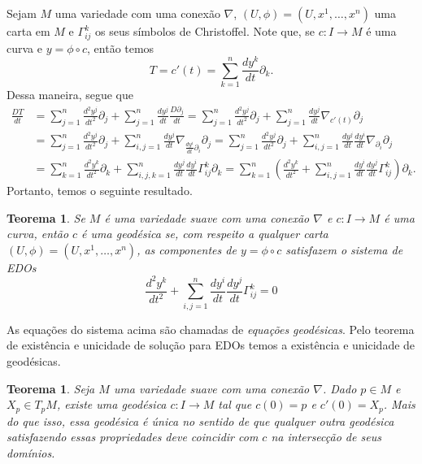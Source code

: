 \documentclass{article}
\newtheorem{theorem}[definition]{Teorema}
\begin{document}
Sejam $M$ uma variedade com uma conexão $\nabla$, $(U, \phi) = (U, x^1, \dots, x^n)$ uma carta em $M$ e $\Gamma^k_{ij}$ os seus símbolos de Christoffel. Note que, se $c \colon I \to M$ é uma curva e $y = \phi \circ c$, então temos \begin{equation}
    T = c'(t) = \sum_{k = 1}^n \frac{dy^k}{dt}\partial_k.
\end{equation} Dessa maneira, segue que \begin{align}
    \frac{DT}{dt} &= \sum_{j = 1}^n \frac{d^2y^j}{dt^2}\partial_j + \sum_{j = 1}^n \frac{dy^j}{dt}\frac{D\partial_j}{dt} = \sum_{j = 1}^n \frac{d^2y^j}{dt^2}\partial_j + \sum_{j = 1}^n \frac{dy^j}{dt} \nabla_{c'(t)}\partial_j \\ &= \sum_{j = 1}^n \frac{d^2y^j}{dt^2}\partial_j + \sum_{i,j = 1}^n \frac{dy^j}{dt} \nabla_{\frac{dy^i}{dt}\partial_i}\partial_j = \sum_{j = 1}^n \frac{d^2y^j}{dt^2}\partial_j + \sum_{i,j = 1}^n \frac{dy^j}{dt}\frac{dy^i}{dt}\nabla_{\partial_i}\partial_j \\ &= \sum_{k = 1}^n \frac{d^2y^k}{dt^2}\partial_k + \sum_{i,j,k = 1}^n \frac{dy^j}{dt}\frac{dy^i}{dt}\Gamma^k_{ij}\partial_k = \sum_{k = 1}^n \left(\frac{d^2y^k}{dt^2} + \sum_{i,j=1}^n \frac{dy^i}{dt}\frac{dy^j}{dt}\Gamma_{ij}^k\right)\partial_k.
\end{align} Portanto, temos o seguinte resultado.

\begin{theorem}
    Se $M$ é uma variedade suave com uma conexão $\nabla$ e $c \colon I \to M$ é uma curva, então $c$ é uma geodésica se, com respeito a qualquer carta $(U, \phi) = (U, x^1, \dots, x^n)$, as componentes de $y = \phi \circ c$ satisfazem o sistema de EDOs \begin{equation}
        \frac{d^2y^k}{dt^2} + \sum_{i,j=1}^n \frac{dy^i}{dt}\frac{dy^j}{dt}\Gamma_{ij}^k = 0
    \end{equation}
\end{theorem}

As equações do sistema acima são chamadas de \textit{equações geodésicas}. Pelo teorema de existência e unicidade de solução para EDOs temos a existência e unicidade de geodésicas.

\begin{theorem}\label{geodesicas_existencia}
    Seja $M$ uma variedade suave com uma conexão $\nabla$. Dado $p \in M$ e $X_p \in T_pM$, existe uma geodésica $c \colon I \to M$ tal que $c(0) = p$ e $c'(0) = X_p$. Mais do que isso, essa geodésica é única no sentido de que qualquer outra geodésica satisfazendo essas propriedades deve coincidir com $c$ na intersecção de seus domínios.
\end{theorem}
\end{document}
